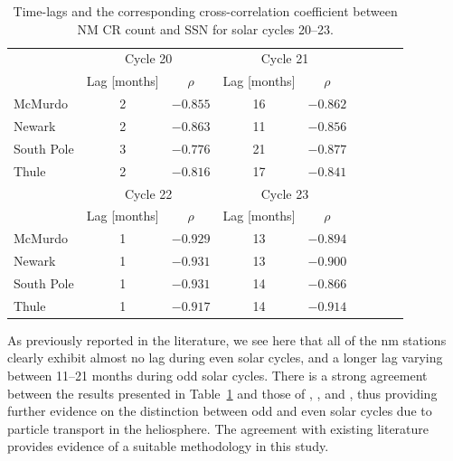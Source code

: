 \begin{table}[!ht]
	\begin{center}
	\caption{Time-lags and the corresponding cross-correlation coefficient between NM CR count and SSN for solar cycles 20--23.}
	\label{table:time_lags_20-23}
	\begin{tabular}{l c c c c c c c c}
		\hline 
		{} & \multicolumn{2}{c}{Cycle 20} & \multicolumn{2}{c}{Cycle 21}  \\
		{} & {Lag [months]} & {$\rho$} & {Lag [months]} & {$\rho$} \\ \hline
		{McMurdo} & {2} & {$-0.855$} & {16} & {$-0.862$}  \\
		{Newark} & {2} & {$-0.863$} & {11} & {$-0.856$} \\
		{South Pole} & {3} & {$-0.776$} & {21} & {$-0.877$}  \\
		{Thule} & {2} & {$-0.816$} & {17} & {$-0.841$} \\ \hline
		
		{} & \multicolumn{2}{c}{Cycle 22} & \multicolumn{2}{c}{Cycle 23}\\
		{} & {Lag [months]} & {$\rho$} & {Lag [months]} & {$\rho$}\\ \hline
		{McMurdo}  & {1} & {$-0.929$} & {13} & {$-0.894$} \\
		{Newark} & {1} & {$-0.931$} & {13} & {$-0.900$} \\
		{South Pole}  & {1} & {$-0.931$} & {14} & {$-0.866$} \\
		{Thule}  & {1} & {$-0.917$} & {14} & {$-0.914$}\\ \hline
	\end{tabular}
	\end{center}
\end{table}


As previously reported in the literature, we see here that all of the \gls{nm} stations clearly exhibit almost no lag during even solar cycles, and a longer lag varying between 11--21 months during odd solar cycles. There is a strong agreement between the results presented in Table~\ref{table:time_lags_20-23} and those of \cite{mavromichalaki_cosmic-ray_2007}, \cite{kane_lags_2014}, and \cite{paouris_solar_2015-1}, thus providing further evidence on the distinction between odd and even solar cycles due to particle transport in the heliosphere. The agreement with existing literature provides evidence of a suitable methodology in this study.

